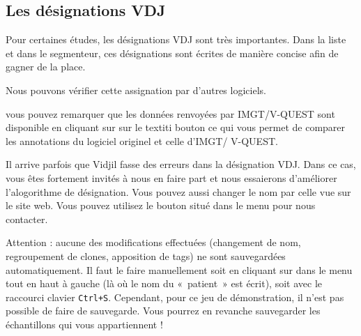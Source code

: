\documentclass[11pt]{article}
\begin{document}
\subsection{Les désignations VDJ}

Pour certaines études, les désignations VDJ sont très importantes.
Dans la liste et dans le segmenteur, ces désignations sont écrites de manière
concise afin de gagner de la place.


Nous pouvons vérifier cette assignation par d'autres logiciels.

  vous pouvez remarquer que les données renvoyées par IMGT/V-QUEST sont disponible en cliquant sur sur le textit{i} bouton ce qui vous permet de comparer les annotations du logiciel originel et celle d'IMGT/ V-QUEST.       

\bigskip

Il arrive parfois que Vidjil fasse des erreurs dans la désignation VDJ.
Dans ce cas, vous êtes fortement invités à nous en faire part et nous
essaierons d'améliorer l'alogorithme de désignation. Vous pouvez aussi
changer le nom par celle vue sur le site web.
Vous pouvez utilisez le bouton   situé dans le menu  
pour nous contacter. 


Attention : aucune des modifications effectuées (changement de nom,
regroupement de clones, apposition de tags) ne sont sauvegardées
automatiquement.
Il faut le faire manuellement soit en cliquant sur  dans le
menu tout en haut à gauche (là où le nom du «~patient~» est écrit), soit avec
le raccourci clavier \texttt{Ctrl+S}.
Cependant, pour ce jeu de démonstration, il n'est pas possible de faire de
sauvegarde. Vous pourrez en revanche sauvegarder les échantillons qui vous
appartiennent !
\end{document}
